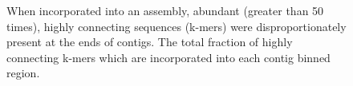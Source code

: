 \documentclass[10pt]{article}
\begin{document}
\begin{figure}[h]
\caption{When incorporated into an assembly, abundant (greater than 50 times), highly connecting sequences (k-mers) were disproportionately present at the ends of contigs.  The total fraction of highly connecting k-mers which are incorporated into each contig binned region.}
\label{stoptag-contig}
\end{figure}
\end{document}
